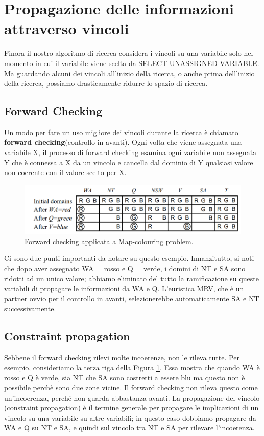 \section{Propagazione delle informazioni attraverso vincoli}
Finora il nostro algoritmo di ricerca considera i vincoli su una variabile solo nel momento in cui il variabile viene scelta da SELECT-UNASSIGNED-VARIABLE. Ma guardando alcuni dei
vincoli all'inizio della ricerca, o anche prima dell'inizio della ricerca, possiamo drasticamente ridurre lo spazio di ricerca.

\subsection{Forward Checking}

Un modo per fare un uso migliore dei vincoli durante la ricerca è chiamato \textbf{forward checking}(controllo in avanti). Ogni volta che viene assegnata una variabile X, il processo di forward checking esamina ogni variabile non assegnata Y che è connessa a X da un vincolo e cancella dal dominio di Y qualsiasi valore non coerente con il valore scelto per X.
\begin{figure}[H]
    \centering
    \includegraphics[width=13cm, keepaspectratio]{img/forward_checking.png}
    \caption{Forward checking applicata a Map-colouring problem.}\label{fig:forward_checking}
\end{figure}

Ci sono due punti importanti da notare su questo esempio. Innanzitutto, si noti che dopo aver assegnato WA = rosso e Q = verde, i domini di NT e SA
sono ridotti ad un unico valore; abbiamo eliminato del tutto la ramificazione su queste variabili di propagare le informazioni da WA e Q. L'euristica MRV, che è un partner ovvio per il controllo in avanti, selezionerebbe automaticamente SA e NT successivamente.

\subsection{Constraint propagation}
Sebbene il forward checking rilevi molte incoerenze, non le rileva tutte. Per esempio, consideriamo la terza riga della Figura \ref{fig:forward_checking}. Essa mostra che quando WA è rosso e Q è verde, sia NT che SA sono costretti a essere blu ma questo non è possibile perchè sono due zone vicine. Il forward checking non rileva questo come un'incoerenza, perché non guarda abbastanza avanti. La propagazione del vincolo (constraint propagation) è il termine generale per propagare le implicazioni di un vincolo su una variabile su altre variabili; in questo caso dobbiamo propagare da WA e Q su NT e SA, e quindi sul vincolo tra NT e SA per rilevare l'incoerenza. 


